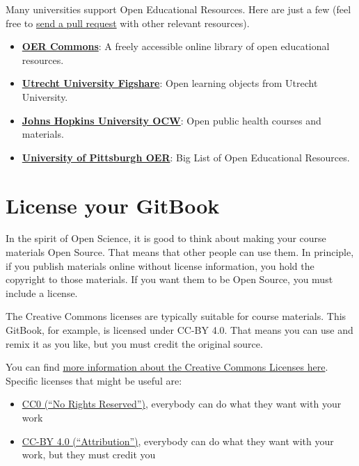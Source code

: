 \documentclass[
]{book}
\providecommand{\tightlist}{%
  \setlength{\itemsep}{0pt}\setlength{\parskip}{0pt}}
\begin{document}
Many universities support Open Educational Resources. Here are just a few (feel free to \href{https://help.github.com/en/github/collaborating-with-issues-and-pull-requests/creating-a-pull-request}{send a pull request} with other relevant resources).

\begin{itemize}
\tightlist
\item
  \href{https://www.oercommons.org/}{\textbf{OER Commons}}: A freely accessible online library of open educational resources.
\item
  \href{https://uu.figshare.com/}{\textbf{Utrecht University Figshare}}: Open learning objects from Utrecht University.
\item
  \href{https://ocw.jhsph.edu/}{\textbf{Johns Hopkins University OCW}}: Open public health courses and materials.
\item
  \href{https://pitt.libguides.com/openeducation/biglist}{\textbf{University of Pittsburgh OER}}: Big List of Open Educational Resources.
\end{itemize}

\hypertarget{license-your-gitbook}{%
\chapter{License your GitBook}\label{license-your-gitbook}}

In the spirit of Open Science, it is good to think about making your course materials Open Source. That means that other people can use them. In principle, if you publish materials online without license information, you hold the copyright to those materials. If you want them to be Open Source, you must include a license.

The Creative Commons licenses are typically suitable for course materials. This GitBook, for example, is licensed under CC-BY 4.0. That means you can use and remix it as you like, but you must credit the original source.

You can find \href{https://creativecommons.org/share-your-work/licensing-examples}{more information about the Creative Commons Licenses here}. Specific licenses that might be useful are:

\begin{itemize}
\tightlist
\item
  \href{https://creativecommons.org/share-your-work/public-domain/cc0/}{CC0 (``No Rights Reserved'')}, everybody can do what they want with your work
\item
  \href{https://creativecommons.org/licenses/by/4.0/}{CC-BY 4.0 (``Attribution'')}, everybody can do what they want with your work, but they must credit you
\end{itemize}

  
\end{document}
